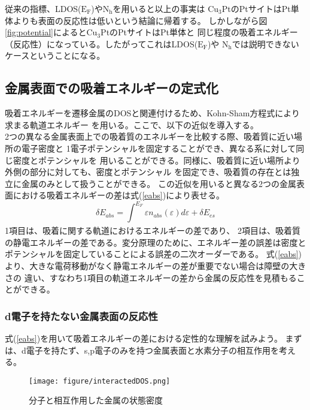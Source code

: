 \documentclass[12pt]{ltjsarticle}
\begin{document}
従来の指標、LDOS($\text{E}_\text{F}$)や$\text{N}_\text{h}$を用いると以上の事実は
$\text{Cu}_\text{3}$PtのPtサイトはPt単体よりも表面の反応性は低いという結論に帰着する。
しかしながら図\ref{fig:potential}によると$\text{Cu}_\text{3}$PtのPtサイトはPt単体と
同じ程度の吸着エネルギー（反応性）になっている。したがってこれはLDOS($\text{E}_\text{F}$)や
$\text{N}_\text{h}$では説明できないケースということになる。

\subsection{金属表面での吸着エネルギーの定式化}
吸着エネルギーを遷移金属のDOSと関連付けるため、Kohn-Sham方程式により求まる軌道エネルギー
を用いる。ここで、以下の近似を導入する。\\
2つの異なる金属表面上での吸着質のエネルギーを比較する際、吸着質に近い場所の電子密度と
1電子ポテンシャルを固定することができ、異なる系に対して同じ密度とポテンシャルを
用いることができる。同様に、吸着質に近い場所より外側の部分に対しても、密度とポテンシャル
を固定でき、吸着質の存在とは独立に金属のみとして扱うことができる。
この近似を用いると異なる2つの金属表面における吸着エネルギーの差は式(\ref{eabs})により表せる。
\begin{equation}
    \label{eabs}
    \delta E_{abs} = \int_{}^{E_F} \varepsilon n_{abs}(\varepsilon) d\varepsilon + 
    \delta E_{es}
\end{equation}
1項目は、吸着に関する軌道におけるエネルギーの差であり、
2項目は、吸着質の静電エネルギーの差である。変分原理のために、エネルギー差の誤差は密度と
ポテンシャルを固定していることによる誤差の二次オーダーである。
式(\ref{eabs})より、大きな電荷移動がなく静電エネルギーの差が重要でない場合は障壁の大きさの
違い、すなわち1項目の軌道エネルギーの差から金属の反応性を見積もることができる。

\subsubsection{d電子を持たない金属表面の反応性}
式(\ref{eabs})を用いて吸着エネルギーの差における定性的な理解を試みよう。
まずは、d電子を持たず、s,p電子のみを持つ金属表面と水素分子の相互作用を考える。
\begin{figure}[hbtp]
    \begin{center}
     \texttt{[image: figure/interactedDOS.png]}
    \end{center}
    \caption{分子と相互作用した金属の状態密度}
    \label{fig:interactedDOS}
\end{figure}
\end{document}
